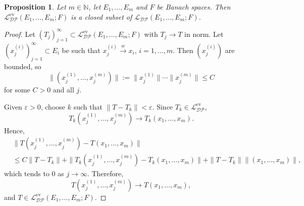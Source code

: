 \documentclass[12 pt]{article}%
\newtheorem{proposition}[theorem]{Proposition}
\newtheorem{final remark}[theorem]{Final Remark}
\begin{document}
\begin{proposition}
	Let $m \in \mathbb{N}$, let $E_1,\dots,E_m$ and $F$ be Banach spaces. Then $\mathcal{L_{DP}^{\mathrm{ev}}}(E_1,\dots,E_m;F)$ is a closed subset of $\mathcal{L_{DP}}(E_1,\dots,E_m;F)$.
\end{proposition}
\begin{proof}
	Let $(T_j)_{j=1}^{\infty} \subset \mathcal{L_{DP}^{\mathrm{ev}}}(E_1,\dots,E_m;F)$ with $T_j \to T$ in norm. Let $(x_j^{(i)})_{j=1}^{\infty} \subset E_i$ be such that $x_j^{(i)} \overset{w}{\to} x_i$, $i=1,\dots,m$. Then $(x_j^{(i)})$ are bounded, so
	\[
	\|(x_j^{(1)},\dots,x_j^{(m)})\| := \|x_j^{(1)}\|\cdots\|x_j^{(m)}\| \le C
	\]
	for some $C>0$ and all $j$.
	
	Given $\varepsilon>0$, choose $k$ such that $\|T-T_k\|<\varepsilon$. Since $T_k \in \mathcal{L_{DP}^{\mathrm{ev}}}$,
	\[
	T_k(x_j^{(1)},\dots,x_j^{(m)}) \to T_k(x_1,\dots,x_m).
	\]
	Hence,
	\begin{align*}
		&\|T(x_j^{(1)},\dots,x_j^{(m)}) - T(x_1,\dots,x_m)\| \\
		&\le C\|T-T_k\| + \|T_k(x_j^{(1)},\dots,x_j^{(m)}) - T_k(x_1,\dots,x_m)\| + \|T-T_k\|\|(x_1,\dots,x_m)\|,
	\end{align*}
	which tends to $0$ as $j \to \infty$. Therefore,
	\[
	T(x_j^{(1)},\dots,x_j^{(m)}) \to T(x_1,\dots,x_m),
	\]
	and $T \in \mathcal{L_{DP}^{\mathrm{ev}}}(E_1,\dots,E_m;F)$.
\end{proof}
\end{document}
